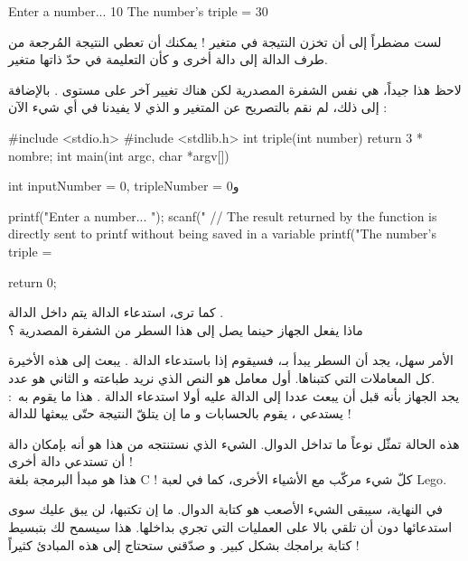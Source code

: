 \begin{Console}
Enter a number... 10
The number's triple = 30
\end{Console}

\begin{information}
لست مضطراً إلى أن تخزن النتيجة في متغير ! يمكنك أن تعطي النتيجة المُرجعة من طرف الدالة 
إلى دالة أخرى و كأن التعليمة
في حدّ ذاتها متغير.
\end{information}
لاحظ هذا جيداً، هي نفس الشفرة المصدرية لكن هناك تغيير آخر على مستوى 
.
بالإضافة إلى ذلك، لم نقم بالتصريح عن المتغير 
و الذي لا يفيدنا في أي شيء الآن :

\begin{Csource}
#include <stdio.h>
#include <stdlib.h>
int triple(int number)
{
	return 3 * nombre;
}
int main(int argc, char *argv[])
{
	int inputNumber = 0, tripleNumber = 0و
	
	printf("Enter a number... ");
	scanf("%
	// The result returned by the function is directly sent to printf without being saved in a variable
	printf("The number's triple = %
	
	return 0;
}
\end{Csource}

كما ترى، استدعاء الدالة 
يتم داخل الدالة 
.\\
ماذا يفعل الجهاز حينما يصل إلى هذا السطر من الشفرة المصدرية ؟

الأمر سهل، يجد أن السطر يبدأ بـ،
فسيقوم إذا باستدعاء الدالة 
.
يبعث إلى هذه الأخيرة كل المعاملات التي كتبناها. أول معامل هو النص الذي نريد طباعته و الثاني هو عدد.\\
يجد الجهاز بأنه قبل أن يبعث عددا إلى الدالة 
عليه أولا استدعاء الدالة 
.
هذا ما يقوم به~: يستدعي 
،
يقوم بالحسابات و ما إن يتلقّ النتيجة حتّى يبعثها للدالة 
 !

هذه الحالة تمثّل نوعاً ما تداخل الدوال. الشيء الذي نستنتجه من هذا هو أنه بإمكان دالة أن تستدعي دالة أخرى !\\
هذا هو مبدأ البرمجة بلغة
\textenglish{C} !
كلّ شيء مركّب مع الأشياء الأخرى، كما في لعبة
\textenglish{Lego}.

في النهاية، سيبقى الشيء الأصعب هو كتابة الدوال. ما إن تكتبها، لن يبق عليك سوى استدعائها دون أن تلقي بالا على العمليات التي تجري بداخلها. هذا سيسمح لك بتبسيط كتابة برامجك بشكل كبير. و صدّقني ستحتاج إلى هذه المبادئ كثيراً !

